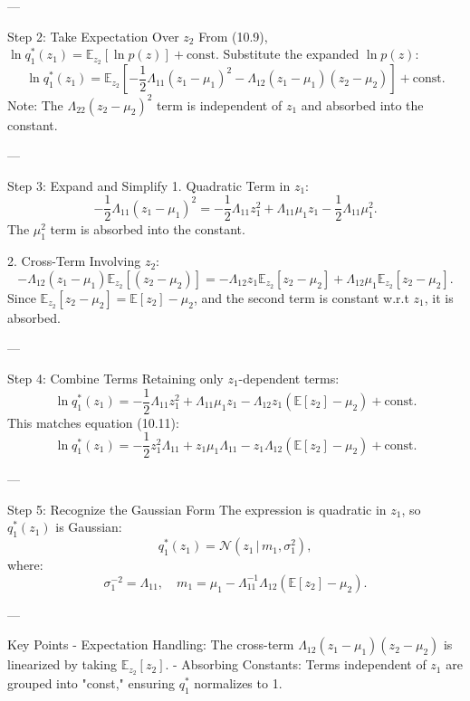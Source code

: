 \documentclass{article}
\begin{document}
---

 Step 2: Take Expectation Over \( z_2 \)
From (10.9), \( \ln q_1^*(z_1) = \mathbb{E}_{z_2}[\ln p(z)] + \text{const} \). Substitute the expanded \( \ln p(z) \):
\[
\ln q_1^*(z_1) = \mathbb{E}_{z_2} \left[ -\frac{1}{2}\Lambda_{11}(z_1 - \mu_1)^2 - \Lambda_{12}(z_1 - \mu_1)(z_2 - \mu_2) \right] + \text{const}.
\]
Note: The \( \Lambda_{22}(z_2 - \mu_2)^2 \) term is independent of \( z_1 \) and absorbed into the constant.

---

 Step 3: Expand and Simplify
1. Quadratic Term in \( z_1 \):
   \[
   -\frac{1}{2}\Lambda_{11}(z_1 - \mu_1)^2 = -\frac{1}{2}\Lambda_{11}z_1^2 + \Lambda_{11}\mu_1 z_1 - \frac{1}{2}\Lambda_{11}\mu_1^2.
   \]
   The \( \mu_1^2 \) term is absorbed into the constant.

2. Cross-Term Involving \( z_2 \):
   \[
   -\Lambda_{12}(z_1 - \mu_1)\mathbb{E}_{z_2}[(z_2 - \mu_2)] = -\Lambda_{12}z_1\mathbb{E}_{z_2}[z_2 - \mu_2] + \Lambda_{12}\mu_1\mathbb{E}_{z_2}[z_2 - \mu_2].
   \]
   Since \( \mathbb{E}_{z_2}[z_2 - \mu_2] = \mathbb{E}[z_2] - \mu_2 \), and the second term is constant w.r.t \( z_1 \), it is absorbed.

---

 Step 4: Combine Terms
Retaining only \( z_1 \)-dependent terms:
\[
\ln q_1^*(z_1) = -\frac{1}{2}\Lambda_{11}z_1^2 + \Lambda_{11}\mu_1 z_1 - \Lambda_{12}z_1\left(\mathbb{E}[z_2] - \mu_2\right) + \text{const}.
\]
This matches equation (10.11):
\[
\ln q_1^*(z_1) = -\frac{1}{2}z_1^2\Lambda_{11} + z_1\mu_1\Lambda_{11} - z_1\Lambda_{12}\left(\mathbb{E}[z_2] - \mu_2\right) + \text{const}.
\]

---

 Step 5: Recognize the Gaussian Form
The expression is quadratic in \( z_1 \), so \( q_1^*(z_1) \) is Gaussian:
\[
q_1^*(z_1) = \mathcal{N}\left(z_1 \,|\, m_1, \sigma_1^2\right),
\]
where:
\[
\sigma_1^{-2} = \Lambda_{11}, \quad m_1 = \mu_1 - \Lambda_{11}^{-1}\Lambda_{12}\left(\mathbb{E}[z_2] - \mu_2\right).
\]

---

 Key Points
- Expectation Handling: The cross-term \( \Lambda_{12}(z_1 - \mu_1)(z_2 - \mu_2) \) is linearized by taking \( \mathbb{E}_{z_2}[z_2] \).
- Absorbing Constants: Terms independent of \( z_1 \) are grouped into "const," ensuring \( q_1^* \) normalizes to 1.

\end{document}
